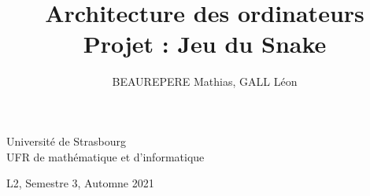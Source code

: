 \documentclass[a4paper]{article}
\title{Architecture des ordinateurs\\\large Projet : Jeu du Snake}
\author{BEAUREPERE Mathias, GALL Léon}
\date{}
\begin{document}
\hspace{-0.5cm}\begin{minipage}{0.5\textwidth}
Université de Strasbourg\\
UFR de mathématique et d'informatique
\end{minipage}
\hspace*{\fill}\begin{minipage}{0.5\textwidth}
\hspace*{\fill}L2, Semestre 3, Automne 2021\\
\hspace*{\fill}\@author
\end{minipage}
\\
\begin{center}
  \huge \@title
\end{center}


\end{document}
